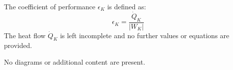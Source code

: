 The coefficient of performance \( \epsilon_K \) is defined as:  
\[
\epsilon_K = \frac{\dot{Q}_K}{|W_K|}
\]  
The heat flow \( \dot{Q}_K \) is left incomplete and no further values or equations are provided.  

No diagrams or additional content are present.
